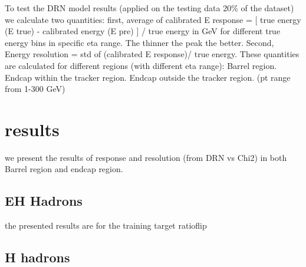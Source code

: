 To test the DRN model results (applied on the testing data 20\% of the dataset) we calculate two quantities: first, average of calibrated E response = [ true energy (E true) - calibrated energy (E pre) ] / true energy in GeV for different true energy bins in specific eta range. The thinner the peak the better. 
Second, Energy resolution = std of (calibrated E response)/ true energy. These quantities are calculated for different regions (with different eta range): Barrel region. Endcap within the tracker region. Endcap outside the tracker region. (pt range from 1-300 GeV)  


\section{results}
we present the results of response and resolution (from DRN vs Chi2) in  both Barrel region and endcap region.

\subsection{EH Hadrons}
the presented results are for the training target ratioflip





\subsection{H hadrons}




